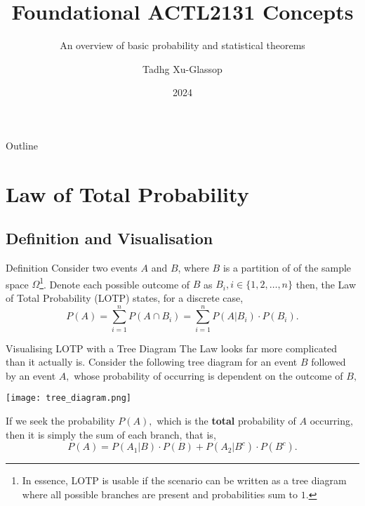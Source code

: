 \documentclass{beamer}
\title{Foundational ACTL2131 Concepts}
\subtitle{An overview of basic probability and statistical theorems}
\author{Tadhg Xu-Glassop}
\institute{UNSW}
\date{2024}
\begin{document}

\begin{frame}
\titlepage
\end{frame}

\begin{frame}{Outline}
    \tableofcontents
\end{frame}

\section{Law of Total Probability}

\subsection{Definition and Visualisation}

\begin{frame}{Definition}
    Consider two events $A$ and $B$, where $B$ is a partition of of the sample space $\Omega$\footnote{In essence, LOTP is usable if the scenario can be written as a tree diagram where all possible branches are present and probabilities sum to $1$.}.
    \newline\newline
    Denote each possible outcome of $B$ as $B_i, i \in \{ 1,2,\dots, n\}$ then, the Law of Total Probability (LOTP) states, for a discrete case,
    $$
    P(A) = \sum_{i=1}^{n} P(A\cap B_i) = \sum_{i=1}^n P(A | B_i) \cdot P(B_i).
    $$
\end{frame}

\begin{frame}{Visualising LOTP with a Tree Diagram}
    The Law looks far more complicated than it actually is. Consider the following tree diagram for an event $B$ followed by an event $A,$ whose probability of occurring is dependent on the outcome of $B,$
    \begin{center}
        \texttt{[image: tree\_diagram.png]}
    \end{center}
    If we seek the probability $P(A),$ which is the \textbf{total} probability of $A$ occurring, then it is simply the sum of each branch, that is,
    $$
    P(A) = P(A_1 | B)\cdot P(B) + P(A_2 | B^c) \cdot P(B^c).
    $$
    
\end{frame}
\end{document}
